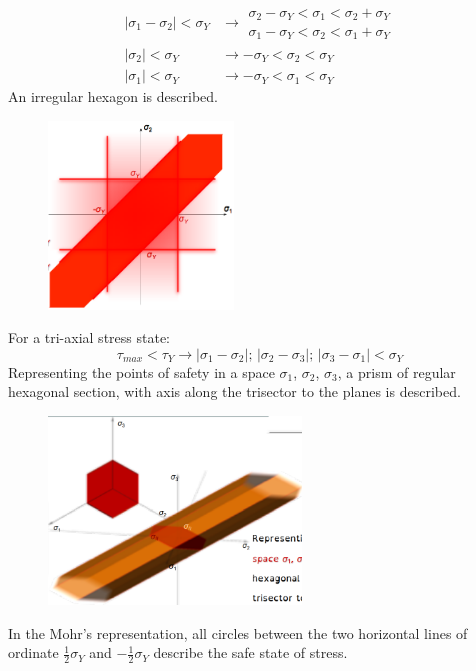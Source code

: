 \documentclass[class=report, crop=false, 12pt,a4paper]{standalone}
\begin{document}
\begin{align}
  \left| \sigma_1 - \sigma_2 \right| < \sigma_Y &\rightarrow \begin{array}{l}
    \sigma_2 - \sigma_Y < \sigma_1 < \sigma_2 + \sigma_Y\\
    \sigma_1 - \sigma_Y < \sigma_2 < \sigma_1 + \sigma_Y
  \end{array}\\
  \left| \sigma_2 \right| < \sigma_Y &\rightarrow - \sigma_Y < \sigma_2 < \sigma_Y\\
  \left| \sigma_1 \right| < \sigma_Y &\rightarrow - \sigma_Y < \sigma_1 < \sigma_Y
\end{align}
An irregular hexagon is described.
\begin{figure}[H]
  \centering
  \includegraphics[height = 5cm]{../img/diagram88.png}
  \caption{}
\end{figure}
For a tri-axial stress state:
\begin{equation}
  \tau_{max} < \tau_Y \rightarrow \left| \sigma_1 - \sigma_2 \right| ; \, \left| \sigma_2 - \sigma_3 \right| ; \, \left| \sigma_3 - \sigma_1 \right| < \sigma_Y
\end{equation}
Representing the points of safety in a space $\sigma_1$, $\sigma_2$, $\sigma_3$, a prism of regular hexagonal section, with axis along the trisector to the planes is described.
\begin{figure}[H]
  \centering
  \includegraphics[height = 5cm]{../img/diagram89.png}
  \caption{}
\end{figure}
In the Mohr's representation, all circles between the two horizontal lines of ordinate $\frac{1}{2}\sigma_Y$ and $-\frac{1}{2}\sigma_Y$ describe the safe state of stress.
\end{document}
